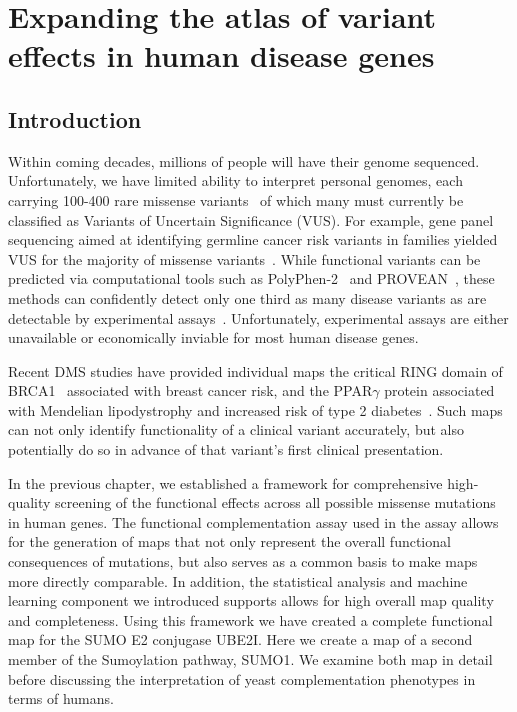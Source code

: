 
\chapter[Expanding the atlas of human disease variants]{Expanding the atlas of variant effects in human disease genes}

\section{Introduction}

Within coming decades, millions of people will have their genome sequenced. Unfortunately, we have limited ability to interpret personal genomes, each carrying 100-400 rare missense variants~\cite{the_1000_genomes_project_consortium_global_2015} of which many must currently be classified as Variants of Uncertain Significance (VUS). For example, gene panel sequencing aimed at identifying germline cancer risk variants in families yielded VUS for the majority of missense variants~\cite{maxwell_evaluation_2016}. While functional variants can be predicted via computational tools such as PolyPhen-2~\cite{adzhubei_predicting_2001} and PROVEAN~\cite{choi_predicting_2012}, these methods can confidently detect only one third as many disease variants as are detectable by experimental assays~\cite{sun_extended_2016}. Unfortunately, experimental assays are either unavailable or economically inviable for most human disease genes. 

Recent DMS studies have provided individual maps the critical RING domain of BRCA1~\cite{starita_massively_2015} associated with breast cancer risk, and the PPAR$\gamma$ protein associated with Mendelian lipodystrophy and increased risk of type 2 diabetes~\cite{majithia_prospective_2016}. Such maps can not only identify functionality of a clinical variant accurately, but also potentially do so in advance of that variant's first clinical presentation. 

In the previous chapter, we established a framework for comprehensive high-quality screening of the functional effects across all possible missense mutations in human genes. The functional complementation assay used in the assay allows for the generation of maps that not only represent the overall functional consequences of mutations, but also serves as a common basis to make maps more directly comparable. In addition, the statistical analysis and machine learning component we introduced supports allows for high overall map quality and completeness. Using this framework we have created a complete functional map for the SUMO E2 conjugase UBE2I. Here we create a map of a second member of the Sumoylation pathway, SUMO1. We examine both map in detail before discussing the interpretation of yeast complementation phenotypes in terms of humans. 

